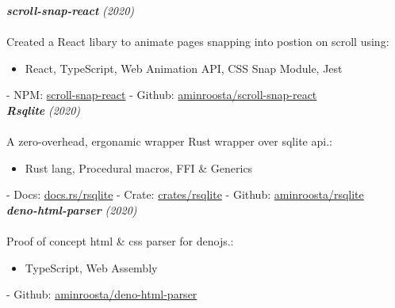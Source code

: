 \documentclass{article}
\newcommand{\h}[1]{\normalsize{\textit{\textbf{#1}}}}
\renewcommand{\i}[1]{\normalsize{\textit{#1}}}
\begin{document}
\h{scroll-snap-react} \hfill \i{(2020)} \\ \vspace {-.3cm} \\
Created a React libary to animate pages snapping into postion on scroll using:\\ \vspace{-.85cm}
\begin{itemize}
 \setlength{\itemsep}{1pt} \setlength{\parskip}{0pt} \setlength{\parsep}{0pt}
    \item React, TypeScript,  Web Animation API, CSS Snap Module, Jest
\end{itemize}  \vspace{-.5cm}
- NPM: \href{https://github.com/aminroosta/scroll-snap-react}{scroll-snap-react}
- Github: \href{https://github.com/aminroosta/scroll-snap-react}{aminroosta/scroll-snap-react} \\

\h{Rsqlite} \hfill \i{(2020)} \\ \vspace {-.3cm} \\
A zero-overhead, ergonamic wrapper Rust wrapper over sqlite api.:\\ \vspace{-.85cm}
\begin{itemize}
 \setlength{\itemsep}{1pt} \setlength{\parskip}{0pt} \setlength{\parsep}{0pt}
    \item Rust lang, Procedural macros, FFI \& Generics
\end{itemize}  \vspace{-.5cm}
- Docs: \href{https://docs.rs/rsqlite/1.0.0/rsqlite/}{docs.rs/rsqlite}
- Crate: \href{https://crates.io/crates/rsqlite}{crates/rsqlite}
- Github: \href{https://github.com/aminroosta/rsqlite}{aminroosta/rsqlite} \\

\h{deno-html-parser} \hfill \i{(2020)} \\ \vspace {-.3cm} \\
Proof of concept html \& css parser for denojs.:\\ \vspace{-.85cm}
\begin{itemize}
 \setlength{\itemsep}{1pt} \setlength{\parskip}{0pt} \setlength{\parsep}{0pt}
    \item TypeScript, Web Assembly
\end{itemize}  \vspace{-.5cm}
- Github: \href{https://github.com/aminroosta/deno-html-parser}{aminroosta/deno-html-parser} \\
\end{document}
